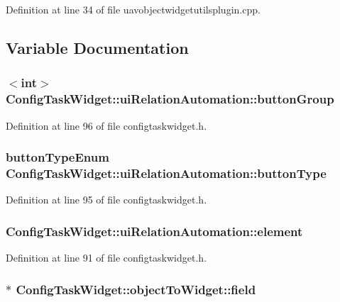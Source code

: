 Definition at line 34 of file uavobjectwidgetutilsplugin.\-cpp.



\subsection{Variable Documentation}
\hypertarget{group___u_a_v_object_widget_utils_ga915cb6bdf9aff1b607f8917b6f665fbd}{
\subsubsection[{button\-Group}]{$<${\bf int}$>$ Config\-Task\-Widget\-::ui\-Relation\-Automation\-::button\-Group}}\label{group___u_a_v_object_widget_utils_ga915cb6bdf9aff1b607f8917b6f665fbd}


Definition at line 96 of file configtaskwidget.\-h.

\hypertarget{group___u_a_v_object_widget_utils_gac8fcf738efe2855fbf1c7a810a20cffd}{
\subsubsection[{button\-Type}]{\setlength{\rightskip}{0pt plus 5cm}button\-Type\-Enum Config\-Task\-Widget\-::ui\-Relation\-Automation\-::button\-Type}}\label{group___u_a_v_object_widget_utils_gac8fcf738efe2855fbf1c7a810a20cffd}


Definition at line 95 of file configtaskwidget.\-h.

\hypertarget{group___u_a_v_object_widget_utils_gabe7df1fc4c590dc11cc6f80698fc125c}{
\subsubsection[{element}]{ Config\-Task\-Widget\-::ui\-Relation\-Automation\-::element}}\label{group___u_a_v_object_widget_utils_gabe7df1fc4c590dc11cc6f80698fc125c}


Definition at line 91 of file configtaskwidget.\-h.

\hypertarget{group___u_a_v_object_widget_utils_ga36fdb22e759e0beae23ae99b03becb68}{
\subsubsection[{field}]{$\ast$ Config\-Task\-Widget\-::object\-To\-Widget\-::field}}\label{group___u_a_v_object_widget_utils_ga36fdb22e759e0beae23ae99b03becb68}



